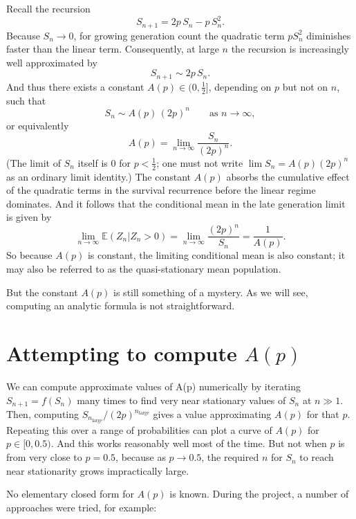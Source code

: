 \documentclass[11pt,a4paper]{article}
\theoremstyle{plain}
\theoremstyle{definition}
\begin{document}
Recall the recursion
\[
S_{n+1} = 2p\, S_n - p\, S_n^2.
\]
Because $S_n \to 0$, for growing generation count the quadratic term $p S_n^2$ diminishes faster than the
linear term. Consequently, at large $n$ the recursion is increasingly well approximated by
\[
S_{n+1} \sim 2p\, S_n.
\]
And thus there exists a constant $A(p)\in(0,\tfrac12]$, depending on $p$ but not on $n$, such that
\begin{equation}
\label{eq:Sn-asymp}
S_n \sim A(p)\,(2p)^n
\qquad\text{as }n\to\infty,
\end{equation}
or equivalently
\begin{equation}
\label{eq:Ap-def-main}
 A(p) = \lim_{n \to \infty} \frac{S_n}{(2p)^n}.
\end{equation}
(The limit of $S_n$ itself is $0$ for $p<\tfrac12$; one must not write $\lim S_n = A(p)(2p)^n$ as an ordinary limit identity.)
The constant $A(p)$ absorbs the cumulative effect of the quadratic terms in the survival recurrence before the linear regime dominates.
And it follows that the conditional mean in the late generation limit is given by
\[
 \lim_{n\to\infty} \mathbb{E}(Z_n | Z_n > 0) = \lim_{n \to \infty} \frac{(2p)^n}{S_n} = \frac{1}{A(p)}.
\]
So because $A(p)$ is constant, the limiting conditional mean is also constant; it may also be referred to as the quasi-stationary mean population.

But the constant $A(p)$ is still something of a mystery. As we will see, computing an analytic formula is not straightforward. 

\section{Attempting to compute $A(p)$}

We can compute approximate values of A(p) numerically by iterating $S_{n+1} = f(S_n)$ many times to find very near stationary 
values of $S_n$ at $n \gg 1$. Then, computing $S_{n_{\text{large}}} / (2p)^{n_{\text{large}}}$ gives a value approximating $A(p)$ for that $p$. 
Repeating this over a range of probabilities can plot a curve of $A(p)$ for $p\in[0, 0.5)$. And this works reasonably well most of the time. But not when $p$ is from very close to $p=0.5$, because as $p\to0.5$, the required $n$
for $S_n$ to reach near stationarity grows impractically large.


No elementary closed form for $A(p)$ is known. During the project, a number of approaches were tried, for example:
\end{document}
